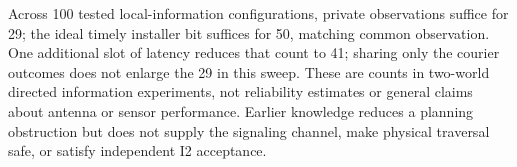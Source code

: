 \documentclass{article}
\begin{document}
Across 100 tested local-information configurations, private
observations suffice for 29; the ideal timely installer bit
suffices for 50, matching common observation. One additional
slot of latency reduces that count to 41; sharing only the
courier outcomes does not enlarge the 29 in this sweep.
These are counts in two-world directed information experiments,
not reliability estimates or general claims about antenna or
sensor performance. Earlier knowledge reduces a planning
obstruction but does not supply the signaling channel, make
physical traversal safe, or satisfy independent I2 acceptance.
\end{document}
